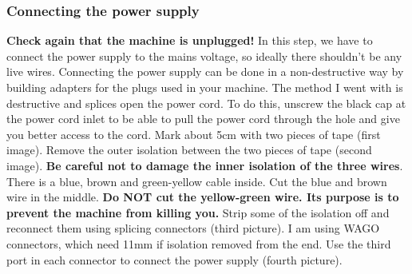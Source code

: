 \documentclass[]{article}
\begin{document}
\subsubsection{Connecting the power supply}
\begin{minipage}[t]{0.5\linewidth}
	\vspace{0pt}
	\textbf{Check again that the machine is unplugged!} In this step, we have to connect the power supply to the mains voltage, so ideally there shouldn't be any live wires. Connecting the power supply can be done in a non-destructive way by building adapters for the plugs used in your machine. The method I went with is destructive and splices open the power cord. To do this, unscrew the black cap at the power cord inlet to be able to pull the power cord through the hole and give you better access to the cord. Mark about 5cm with two pieces of tape (first image). Remove the outer isolation between the two pieces of tape (second image). \textbf{Be careful not to damage the inner isolation of the three wires}. There is a blue, brown and green-yellow cable inside. Cut the blue and brown wire in the middle. \textbf{Do NOT cut the yellow-green wire. Its purpose is to prevent the machine from killing you.} Strip some of the isolation off and reconnect them using splicing connectors (third picture). I am using WAGO connectors, which need 11mm if isolation removed from the end. Use the third port in each connector to connect the power supply (fourth picture).
\end{minipage}
\hfill
\end{document}
